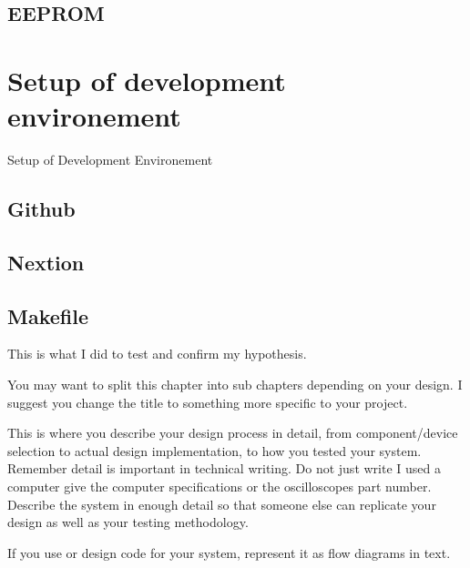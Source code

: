 \subsection{EEPROM}


\section{Setup of development environement}
Setup of Development Environement
\subsection{Github}
\subsection{Nextion}
\subsection{Makefile}

This is what I did to test and confirm my hypothesis.


You may want to split this chapter into sub chapters depending on your design. I suggest you change
the title to something more specific to your project.

This is where you describe your design process in detail, from component/device selection to actual
design implementation, to how you tested your system. Remember detail is important in technical
writing. Do not just write I used a computer give the computer specifications or the oscilloscopes part
number. Describe the system in enough detail so that someone else can replicate your design as well
as your testing methodology.

If you use or design code for your system, represent it as flow diagrams in text.
